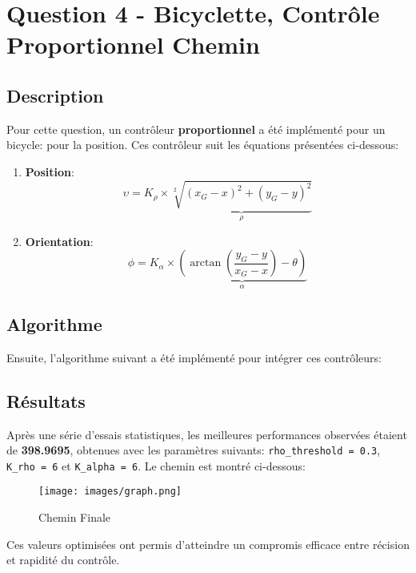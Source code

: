 \documentclass[../CSC_5RO16_TA_TP3.tex]{subfiles}
\begin{document}
\section{Question 4 - Bicyclette, Contrôle Proportionnel Chemin}

\subsection{Description}
\noindent Pour cette question, un contrôleur \textbf{proportionnel} a été implémenté pour un bicycle: pour la position. Ces contrôleur suit les équations présentées ci-dessous:
\begin{enumerate}
    \item \textbf{Position}:
    \begin{equation}
        \upsilon = K_{\rho} \times \underbrace{\sqrt[2]{(x_{G} - x)^2 + (y_{G} - y)^2}}_{\rho}
    \end{equation}
    \item \textbf{Orientation}:
    \begin{equation}
        \phi = K_{\alpha} \times \underbrace{\left(\arctan\left(\frac{y_{G} - y}{x_{G} - x}\right) - \theta\right)}_{\alpha}
    \end{equation}
\end{enumerate}

\subsection{Algorithme}
\noindent Ensuite, l'algorithme suivant a été implémenté pour intégrer ces contrôleurs:
\begin{scriptsize}\mycode
    
\end{scriptsize}

\subsection{Résultats}
\noindent Après une série d'essais statistiques, les meilleures performances observées étaient de \textbf{398.9695}, obtenues avec les paramètres suivants: \texttt{rho\_threshold = 0.3}, \texttt{K\_rho = 6} et \texttt{K\_alpha = 6}. Le chemin est montré ci-dessous:

\begin{figure}[H]
	\centering
	\texttt{[image: images/graph.png]}
	\caption{Chemin Finale}
	\label{}
\end{figure}

\noindent Ces valeurs optimisées ont permis d'atteindre un compromis efficace entre récision et rapidité du contrôle.
\end{document}
